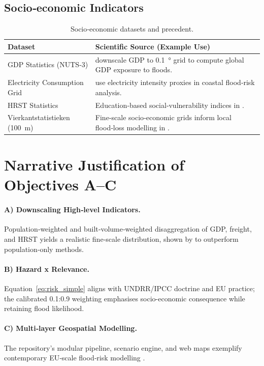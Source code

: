 \documentclass[a4paper,11pt]{article}
\begin{document}
\subsection{Socio‑economic Indicators}
\begin{table}[H]
\centering
\caption{Socio‑economic datasets and precedent.}
\label{tab:socio}
\begin{tabularx}{\textwidth}{@{}l X@{}}
\toprule
\textbf{Dataset} & \textbf{Scientific Source (Example Use)} \\ \midrule
GDP Statistics (NUTS‑3) & \citet{Willner2018} downscale GDP to \SI{0.1}{\degree} grid to compute global GDP exposure to floods. \\ 
Electricity Consumption Grid & \citet{Baptista2021} use electricity intensity proxies in coastal flood‑risk analysis. \\ 
HRST Statistics & Education‑based social‑vulnerability indices in \citet{Fekete2019}. \\ 
Vierkantstatistieken (\SI{100}{m}) & Fine‑scale socio‑economic grids inform local flood‑loss modelling in \citet{Tanoue2021}. \\ \bottomrule
\end{tabularx}
\end{table}

\section{Narrative Justification of Objectives A–C}
\paragraph{A) Downscaling High‑level Indicators.} Population‑weighted and built‑volume‑weighted disaggregation of GDP, freight, and HRST yields a realistic fine‑scale distribution, shown by \citet{Willner2018,Tanoue2021,Baldassi2021} to outperform population‑only methods.

\paragraph{B) Hazard x Relevance.} Equation~\ref{eq:risk_simple} aligns with UNDRR/IPCC doctrine and EU practice; the calibrated 0.1:0.9 weighting emphasises socio-economic consequence while retaining flood likelihood.

\paragraph{C) Multi‑layer Geospatial Modelling.} The repository’s modular pipeline, scenario engine, and web maps exemplify contemporary EU‑scale flood‑risk modelling \citep{Wing2021,Dottori2016,Vousdoukas2018}.
\end{document}
